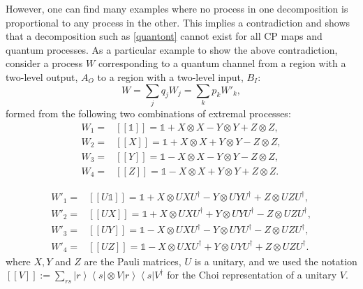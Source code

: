 \documentclass[a4paper,onecolumn,11pt,accepted=2018-05-04]{quantumarticle}
\newcommand{\id}{\mathds{1}}
\newcommand{\bra}[1]{\left\langle #1 \right|}
\newcommand{\ket}[1]{\left| #1 \right\rangle}
\newcommand{\Proj}[1]{[[#1]]}
\begin{document}
However, one can find many examples where no process in one decomposition is proportional to any process in the other. This implies a contradiction and shows that a decomposition such as \eqref{quantont} cannot exist for all CP maps and quantum processes. As a particular example to show the above contradiction, consider a process $W$ corresponding to a quantum channel from a region with a two-level output, $A_O$ to a region with a two-level input, $B_I$:
\begin{equation}
W =  \sum_j q_j W_j = \sum_k p_kW'_k,
\end{equation}
formed from the following two combinations of extremal processes:
\begin{align}
W_1=&\Proj{\id} = \id +X\otimes X -Y\otimes Y+Z\otimes Z,\\
W_2=&\Proj{X}= \id +X\otimes X +Y\otimes Y-Z\otimes Z,\\
W_3=&\Proj{Y} = \id -X\otimes X -Y\otimes Y-Z\otimes Z,\\
W_4=&\Proj{Z} = \id -X\otimes X +Y\otimes Y+Z\otimes Z.
\end{align}

\begin{align}
W'_1=&\Proj{U\id} = \id +X\otimes UXU^\dagger -Y\otimes UYU^\dagger+Z\otimes UZU^\dagger,\\
W'_2=&\Proj{UX}= \id +X\otimes UXU^\dagger +Y\otimes UYU^\dagger - Z\otimes UZU^\dagger,\\
W'_3=&\Proj{UY} = \id -X\otimes UXU^\dagger -Y\otimes UYU^\dagger-Z\otimes UZU^\dagger,\\
W'_4=&\Proj{UZ} = \id -X\otimes UXU^\dagger+Y\otimes UYU^\dagger+Z\otimes UZU^\dagger.
\end{align}
where $X, Y$ and $Z$ are the Pauli matrices, $U$ is a unitary, and we used the notation $\Proj{V}:=\sum_{rs}\ket{r}\bra{s}\otimes V \ket{r}\bra{s}V^{\dag}$ for the Choi representation of a unitary $V$.
\end{document}
